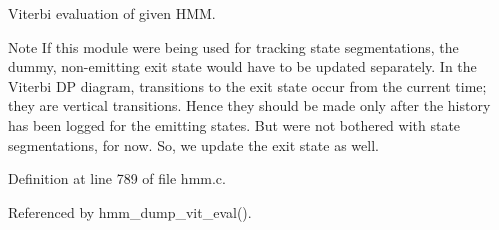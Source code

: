 Viterbi evaluation of given H\+MM. 

\begin{DoxyNote}{Note}
If this module were being used for tracking state segmentations, the dummy, non-\/emitting exit state would have to be updated separately. In the Viterbi DP diagram, transitions to the exit state occur from the current time; they are vertical transitions. Hence they should be made only after the history has been logged for the emitting states. But we\textquotesingle{}re not bothered with state segmentations, for now. So, we update the exit state as well. 
\end{DoxyNote}


Definition at line 789 of file hmm.\+c.



Referenced by hmm\+\_\+dump\+\_\+vit\+\_\+eval().

